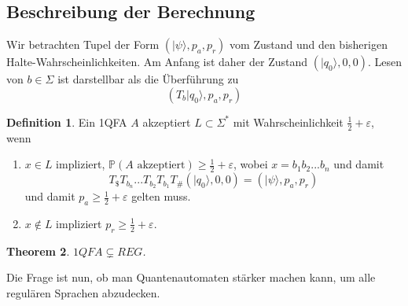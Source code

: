 \documentclass[a4paper, 12pt]{article}
\theoremstyle{plain}
\newtheorem{theorem}{Theorem}[section] %
\theoremstyle{definition}
\newtheorem{definition}[theorem]{Definition} %
\theoremstyle{lemma}
\theoremstyle{remark}
\theoremstyle{example}
\begin{document}
	\subsection{Beschreibung der Berechnung}
	Wir betrachten Tupel der Form $(|\psi\rangle, p_a, p_r)$ vom Zustand und den bisherigen Halte-Wahrscheinlichkeiten. Am Anfang ist daher der Zustand $(|q_0\rangle, 0, 0)$. Lesen von $b \in \Sigma$ ist darstellbar als die Überführung zu \[(T_b|q_0\rangle,p_a,p_r)\]
	
	\begin{definition}
		Ein 1QFA $A$ akzeptiert $L\subset \Sigma^*$ mit Wahrscheinlichkeit $\frac{1}{2}+\varepsilon$, wenn \begin{enumerate}
			\item $x\in L$ impliziert, $\mathbb{P}(A \text{ akzeptiert}) \geq \frac{1}{2} + \varepsilon$, wobei $x = b_1b_2...b_n$ und damit \[T_\$T_{b_n}...T_{b_2}T_{b_1}T_\#(|q_0\rangle,0,0) = (|\psi\rangle, p_a, p_r)\] und damit $p_a \geq \frac{1}{2}+\varepsilon$ gelten muss. 
			\item $x\notin L$ impliziert $p_r \geq \frac{1}{2}+\varepsilon$.
		\end{enumerate}
	\end{definition}
	\begin{theorem}
		$1QFA \subsetneq REG$.
	\end{theorem}
	Die Frage ist nun, ob man Quantenautomaten stärker machen kann, um alle regulären Sprachen abzudecken.
\end{document}

